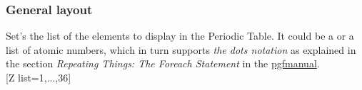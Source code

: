 \subsubsection{\texorpdfstring{ General layout}{General layout}}%
\label{option_Z list}%
%
{Set's the list of the elements to display in the Periodic Table. It could be a  or a  list of atomic numbers, which in turn supports \textit{the dots notation} as explained in the section \textit{Repeating Things: The Foreach Statement} in the \href{https://www.ctan.org/pkg/pgf}{pgfmanual}.}
\\ [5pt][Z list={1,...,36}]%
\\ [5pt]\makebox[\linewidth][c]{\scalebox{.6}{\pgfPT[Z list={1,...,36}]}}%
